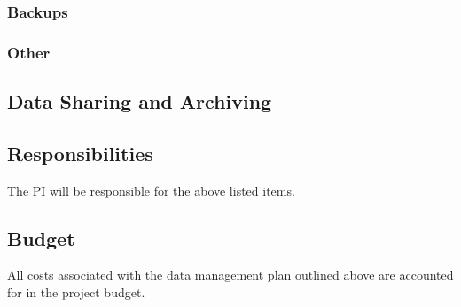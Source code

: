 \documentclass[letterpaper,twoside,11pt,headings=small]{scrartcl}
\begin{document}
\subsubsection*{Backups}

\subsubsection*{Other}

\subsection{Data Sharing and Archiving}

\subsection{Responsibilities}

The PI will be responsible for the above listed items.

\subsection{Budget}

All costs associated with the data management plan outlined above are
accounted for in the project budget.
\end{document}
